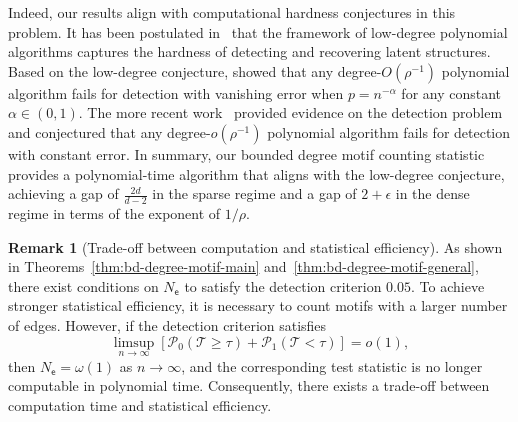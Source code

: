 \documentclass[letterpaper,11pt]{article}
\theoremstyle{definition}
\newtheorem{remark}{Remark}
\newcommand{\maM}{\mathcal{M}}
\newcommand{\maP}{\mathcal{P}}
\newcommand{\maT}{\mathcal{T}}
\newcommand{\qth}[1]{\left[ #1 \right]}
\newcommand{\sfe}{{\mathsf{e}}}
\newcommand{\ER}{Erd\H{o}s-R\'enyi }
\begin{document}
Indeed, our results align with computational hardness conjectures in this problem.
It has been postulated in~\cite{hopkins2017efficient,hopkins2018statistical} that the framework of low-degree polynomial algorithms  captures the hardness of detecting and recovering latent structures. Based on the low-degree conjecture, \cite{ding2023low} showed that any degree-$O(\rho^{-1})$ polynomial algorithm fails for detection with vanishing error when $p = n^{-\alpha}$ for any constant $\alpha\in (0,1)$. The more recent work~\cite{li2025algorithmic} provided evidence on the detection problem and conjectured that any degree-$o(\rho^{-1})$ polynomial algorithm fails for detection with constant error. In summary, our bounded degree motif counting statistic provides a polynomial-time algorithm that aligns with the low-degree conjecture, achieving a gap of $\frac{2d}{d-2}$ in the sparse regime and a gap of $2+\epsilon$ in the dense regime in terms of the exponent of $1/\rho$.







\begin{remark}[Trade-off between computation and statistical efficiency]
As shown in Theorems~\ref{thm:bd-degree-motif-main} and~\ref{thm:bd-degree-motif-general}, there exist conditions on $N_\sfe$ to satisfy the detection criterion $0.05$. %
To achieve stronger statistical efficiency, it is necessary to count motifs with a larger number of edges. However, if the detection criterion satisfies $$\limsup_{n\to\infty}\qth{\maP_0(\maT\ge \tau)+\maP_1(\maT<\tau)} = o(1),$$ then $N_\sfe = \omega(1)$ as $n \to \infty$, and the corresponding test statistic is no longer computable in polynomial time. Consequently, there exists a trade-off between computation time and statistical efficiency.
\end{remark}

\end{document}
